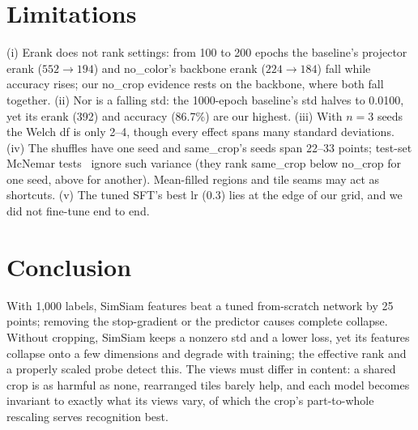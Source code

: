 \documentclass[10pt,twocolumn,letterpaper]{article}
\begin{document}
\section{Limitations}
\label{sec:limitations}

(i) Erank does not rank settings: from 100 to 200 epochs the baseline's projector erank ($552\to194$) and no\_color's backbone erank ($224\to184$) fall while accuracy rises; our no\_crop evidence rests on the backbone, where both fall together.
(ii) Nor is a falling std: the 1000-epoch baseline's std halves to 0.0100, yet its erank (392) and accuracy (86.7\%) are our highest.
(iii) With $n{=}3$ seeds the Welch df is only 2--4, though every effect spans many standard deviations.
(iv) The shuffles have one seed and same\_crop's seeds span 22--33 points; test-set McNemar tests~\cite{mcnemar1947} ignore such variance (they rank same\_crop below no\_crop for one seed, above for another). Mean-filled regions and tile seams may act as shortcuts.
(v) The tuned SFT's best lr (0.3) lies at the edge of our grid, and we did not fine-tune end to end.

\section{Conclusion}
\label{sec:conclusion}
With 1,000 labels, SimSiam features beat a tuned from-scratch network by 25 points; removing the stop-gradient or the predictor causes complete collapse.
Without cropping, SimSiam keeps a nonzero std and a lower loss, yet its features collapse onto a few dimensions and degrade with training; the effective rank and a properly scaled probe detect this.
The views must differ in content: a shared crop is as harmful as none, rearranged tiles barely help, and each model becomes invariant to exactly what its views vary, of which the crop's part-to-whole rescaling serves recognition best.

{
    \small
    
    
}
\end{document}
